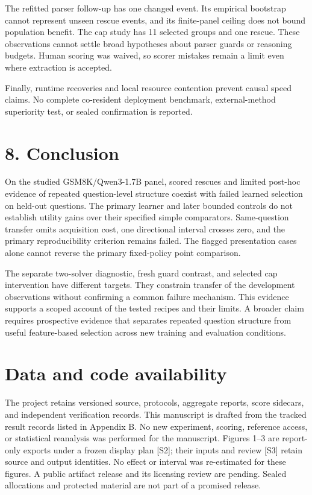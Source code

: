 \documentclass[11pt,a4paper]{article}
\begin{document}
The refitted parser follow-up has one changed event. Its empirical bootstrap cannot represent unseen rescue events, and its finite-panel ceiling does not bound population benefit. The cap study has 11 selected groups and one rescue. These observations cannot settle broad hypotheses about parser guards or reasoning budgets. Human scoring was waived, so scorer mistakes remain a limit even where extraction is accepted.

Finally, runtime recoveries and local resource contention prevent causal speed claims. No complete co-resident deployment benchmark, external-method superiority test, or sealed confirmation is reported.

\section*{8. Conclusion}\label{sec:8-conclusion}
On the studied GSM8K/Qwen3-1.7B panel, scored rescues and limited post-hoc evidence of repeated question-level structure coexist with failed learned selection on held-out questions. The primary learner and later bounded controls do not establish utility gains over their specified simple comparators. Same-question transfer omits acquisition cost, one directional interval crosses zero, and the primary reproducibility criterion remains failed. The flagged presentation cases alone cannot reverse the primary fixed-policy point comparison.

The separate two-solver diagnostic, fresh guard contrast, and selected cap intervention have different targets. They constrain transfer of the development observations without confirming a common failure mechanism. This evidence supports a scoped account of the tested recipes and their limits. A broader claim requires prospective evidence that separates repeated question structure from useful feature-based selection across new training and evaluation conditions.

\section*{Data and code availability}\label{sec:data-and-code-availability}
The project retains versioned source, protocols, aggregate reports, score sidecars, and independent verification records. This manuscript is drafted from the tracked result records listed in Appendix B. No new experiment, scoring, reference access, or statistical reanalysis was performed for the manuscript. Figures 1--3 are report-only exports under a frozen display plan [S2]; their inputs and review [S3] retain source and output identities. No effect or interval was re-estimated for these figures. A public artifact release and its licensing review are pending. Sealed allocations and protected material are not part of a promised release.
\end{document}
